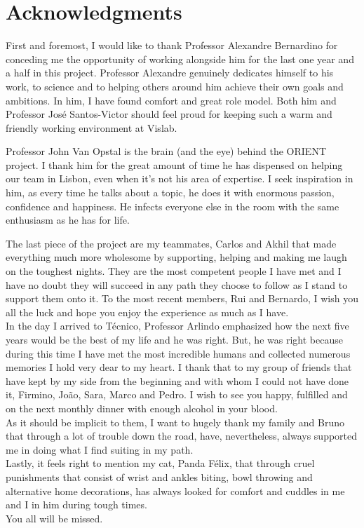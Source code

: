 
\chapter*{Acknowledgments}
First and foremost, I would like to thank Professor Alexandre Bernardino for conceding me the opportunity of working alongside him for the last one year and a half in this project. Professor Alexandre genuinely dedicates himself to his work, to science and to helping others around him achieve their own goals and ambitions. In him, I have found comfort and great role model. Both him and Professor José Santos-Victor should feel proud for keeping such a warm and friendly working environment at Vislab.

Professor John Van Opstal is the brain (and the eye) behind the ORIENT project. I thank him for the great amount of time he has dispensed on helping our team in Lisbon, even when it's not his area of expertise. I seek inspiration in him, as every time he talks about a topic, he does it with enormous passion, confidence and happiness. He infects everyone else in the room with the same enthusiasm as he has for life.

The last piece of the project are my teammates, Carlos and Akhil that made everything much more wholesome by supporting, helping and making me laugh on the toughest nights. They are the most competent people I have met and I have no doubt they will succeed in any path they choose to follow as I stand to support them onto it. To the most recent members, Rui and Bernardo, I wish you all the luck and hope you enjoy the experience as much as I have.\\

In the day I arrived to Técnico, Professor Arlindo emphasized how the next five years would be the best of my life and he was right. But, he was right because during this time I have met the most incredible humans and collected  numerous memories I hold very dear to my heart. I thank that to my group of friends that have kept by my side from the beginning and with whom I could not have done it, Firmino, João, Sara, Marco and Pedro. I wish to see you happy, fulfilled and on the next monthly dinner with enough alcohol in your blood.\\

As it should be implicit to them, I want to hugely thank my family and Bruno that through a lot of trouble down the road, have, nevertheless, always supported me in doing what I find suiting in my path.\\ 

Lastly, it feels right to mention my cat, Panda Félix, that through cruel punishments that consist of wrist and ankles biting, bowl throwing and alternative home decorations, has always looked for comfort and cuddles in me and I in him during tough times.\\

You all will be missed.







